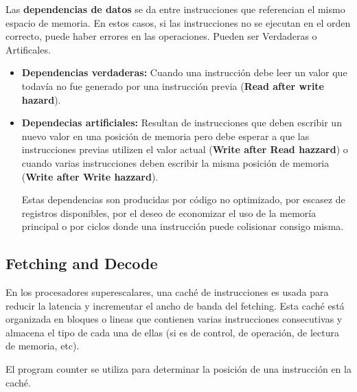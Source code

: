 Las \textbf{dependencias de datos} se da entre instrucciones que referencian el mismo espacio de memoria. En estos casos, si las instrucciones no se ejecutan en el orden correcto, puede haber errores en las operaciones. Pueden ser Verdaderas o Artificales.
\begin{itemize}
	\item \textbf{Dependencias verdaderas:} Cuando una instrucción debe leer un valor que todavía no fue generado por una instrucción previa (\textbf{Read after write hazard}).
	\item \textbf{Dependecias artificiales:} Resultan de instrucciones que deben escribir un nuevo valor en una posición de memoria pero debe esperar a que las instrucciones previas utilizen el valor actual (\textbf{Write after Read hazzard}) o cuando varias instrucciones deben escribir la misma posición de memoria (\textbf{Write after Write hazzard}).
	
	Estas dependencias son producidas por código no optimizado, por escasez de registros disponibles, por el deseo de economizar el uso de la memoría principal o por ciclos donde una instrucción puede colisionar consigo misma.
	
\end{itemize}


\subsection{Fetching and Decode}
En los procesadores superescalares, una caché de instrucciones es usada para reducir la latencia y incrementar el ancho de banda del fetching. Esta caché está organizada en bloques o lineas que contienen varias instrucciones consecutivas y almacena el tipo de cada una de ellas (si es de control, de operación, de lectura de memoria, etc). 

El program counter se utiliza para determinar la posición de una instrucción en la caché.

